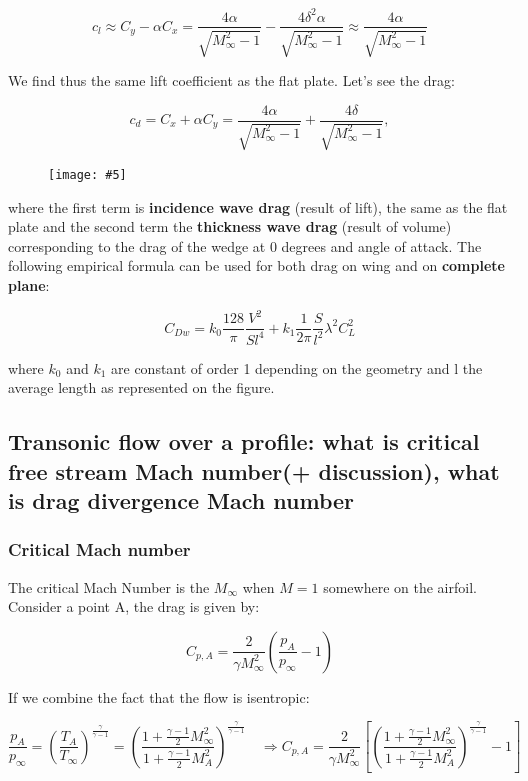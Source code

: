 \documentclass[british,french,11pt, a4paper, openany]{article}
\newcommand{\wrapfig}[6]{%
	\begin{figure}%
		\vspace{-5mm}%
		\texttt{[image: \#5]}%
		\captionof{figure}{}%
		\label{#6}%
	\end{figure}%
}
\begin{document}
\begin{equation}
c_l \approx C_y - \alpha C_x = \frac{4\alpha }{\sqrt{M_\infty ^2 -1}} - \frac{4\delta ^2\alpha }{\sqrt{M_\infty ^2 -1}}  \approx \frac{4\alpha }{\sqrt{M_\infty ^2 -1}} 
\end{equation}

We find thus the same lift coefficient as the flat plate. Let's see the drag: 

\begin{equation}
c_d = C_x + \alpha C_y = \frac{4\alpha }{\sqrt{M_\infty ^2 -1}} + \frac{4\delta}{\sqrt{M_\infty ^2 -1}},
\end{equation}

\wrapfig{11}{l}{3}{0.3}{ch6/20}{fig:6.20}
where the first term is \textbf{incidence wave drag} (result of lift), the same as the flat plate and the second term the \textbf{thickness wave drag} (result of volume) corresponding to the drag of the wedge at 0 degrees and angle of attack. The following empirical formula can be used for both drag on wing and on \textbf{complete plane}: 

\begin{equation}
C_{Dw} = k_0 \frac{128}{\pi} \frac{V^2}{Sl^4} + k_1 \frac{1}{2\pi} \frac{S}{l^2}\lambda ^2 C_L^2
\end{equation}

where $k_0$ and $k_1$ are constant of order 1 depending on the geometry and l the average length as represented on the figure. 

\subsection{Transonic flow over a profile: what is critical free stream Mach number(+ discussion), what is drag divergence Mach number}
\subsubsection{Critical Mach number}
The critical Mach Number is the $M_\infty$ when $M = 1$ somewhere on the airfoil. Consider a point A, the drag is given by: 

\begin{equation}
C_{p,A} = \frac{2}{\gamma M_\infty^2} \left( \frac{p_A}{p_\infty} -1 \right)
\end{equation}

If we combine the fact that the flow is isentropic:

\begin{equation}
\frac{p_A}{p_\infty} = \left(\frac{T_A}{T_\infty}\right)^{\frac{\gamma}{\gamma -1}} = \left(\frac{1+\frac{\gamma - 1}{2}M^2_\infty}{1+\frac{\gamma - 1}{2}M^2_A}\right)^{\frac{\gamma}{\gamma -1}} 
\quad \Rightarrow C_{p,A} = \frac{2}{\gamma M_\infty^2} \left[ \left(\frac{1+\frac{\gamma - 1}{2}M^2_\infty}{1+\frac{\gamma - 1}{2}M^2_A}\right)^{\frac{\gamma}{\gamma -1}} -1 \right]
\end{equation}
\end{document}
